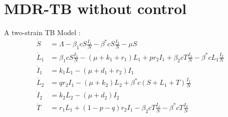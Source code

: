 \section{MDR-TB without control}  \label{Chap4-Sect1} 

A two-strain TB Model \cite{Castillo-Chavez1997}:
\begin{align*}
	\dot{S}	&= 
    	\Lambda -\beta_{1} cS \frac{I_1}{N} - \beta^{*}cS\frac{I_2}{N} - 
        \mu S 
        \\
    \dot{L}_1 &= 
    	\beta_{1} cS \frac{I_1}{N} - (\mu + k_1 + r_1)L_{1} + pr_2 I_1 + 
        \beta_{2} cT \frac{I_1}{N} - \beta^{*}cL_{1}\frac{I_2}{N}  
        \\
    \dot{I}_1 &=  
    	k_1 L_{1} - (\mu + d_1 + r_2)I_1  
        \\
    \dot{L}_2 &=  
    	q r_2 I_1 - (\mu + k_2)L_2 + \beta^{*}c(S + L_1 + T)\frac{I_2}{N}  
        \\
    \dot{I}_2 &=  
    	k_2 L_2 - (\mu + d_2)I_2  
        \\
    \dot{T} &=  
    	r_1 L_{1} + (1-p-q)r_2 I_1 - \beta_{2} cT \frac{I_1}{N} - 
        \beta^{*}cT\frac{I_2}{N}  
\end{align*}



